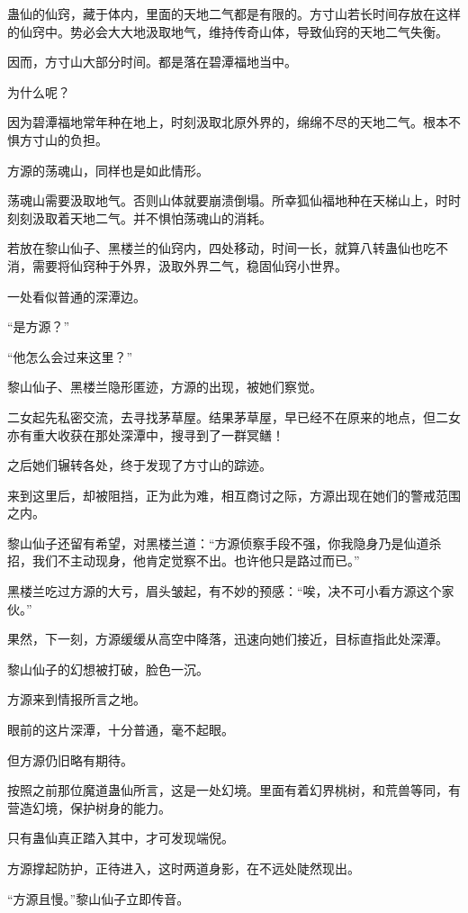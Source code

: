 \begin{this_body}
蛊仙的仙窍，藏于体内，里面的天地二气都是有限的。方寸山若长时间存放在这样的仙窍中。势必会大大地汲取地气，维持传奇山体，导致仙窍的天地二气失衡。

因而，方寸山大部分时间。都是落在碧潭福地当中。

为什么呢？

因为碧潭福地常年种在地上，时刻汲取北原外界的，绵绵不尽的天地二气。根本不惧方寸山的负担。

方源的荡魂山，同样也是如此情形。

荡魂山需要汲取地气。否则山体就要崩溃倒塌。所幸狐仙福地种在天梯山上，时时刻刻汲取着天地二气。并不惧怕荡魂山的消耗。

若放在黎山仙子、黑楼兰的仙窍内，四处移动，时间一长，就算八转蛊仙也吃不消，需要将仙窍种于外界，汲取外界二气，稳固仙窍小世界。

一处看似普通的深潭边。

“是方源？”

“他怎么会过来这里？”

黎山仙子、黑楼兰隐形匿迹，方源的出现，被她们察觉。

二女起先私密交流，去寻找茅草屋。结果茅草屋，早已经不在原来的地点，但二女亦有重大收获在那处深潭中，搜寻到了一群冥鳝！

之后她们辗转各处，终于发现了方寸山的踪迹。

来到这里后，却被阻挡，正为此为难，相互商讨之际，方源出现在她们的警戒范围之内。

黎山仙子还留有希望，对黑楼兰道：“方源侦察手段不强，你我隐身乃是仙道杀招，我们不主动现身，他肯定觉察不出。也许他只是路过而已。”

黑楼兰吃过方源的大亏，眉头皱起，有不妙的预感：“唉，决不可小看方源这个家伙。”

果然，下一刻，方源缓缓从高空中降落，迅速向她们接近，目标直指此处深潭。

黎山仙子的幻想被打破，脸色一沉。

方源来到情报所言之地。

眼前的这片深潭，十分普通，毫不起眼。

但方源仍旧略有期待。

按照之前那位魔道蛊仙所言，这是一处幻境。里面有着幻界桃树，和荒兽等同，有营造幻境，保护树身的能力。

只有蛊仙真正踏入其中，才可发现端倪。

方源撑起防护，正待进入，这时两道身影，在不远处陡然现出。

“方源且慢。”黎山仙子立即传音。


\end{this_body}
